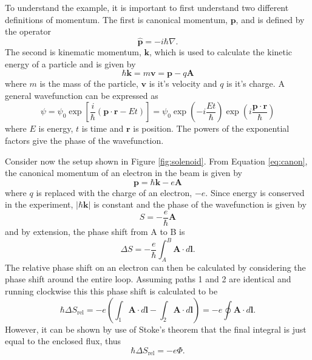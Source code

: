 \documentclass{article}
\begin{document}
To understand the example, it is important to first understand two different definitions of momentum. The first is canonical momentum, $\mathbf{p}$, and is defined by the operator
\begin{equation}
    \hat{\mathbf{p}}=-i\hbar\nabla.
    \label{eq:canon}
\end{equation}
The second is kinematic momentum, $\mathbf{k}$, which is used to calculate the kinetic energy of a particle and is given by
\begin{equation}
    \hbar\mathbf{k}=m\mathbf{v}=\mathbf{p}-q\mathbf{A}
    \label{kinetic}
\end{equation}
where $m$ is the mass of the particle, $\mathbf{v}$ is it's velocity and $q$ is it's charge. A general wavefunction can be expressed as
\begin{equation}
    \psi=\psi_0\exp[\frac{i}{\hbar}(\mathbf{p}\cdot\mathbf{r}-Et)]=\psi_0\exp(-i\frac{Et}{\hbar})\exp(i\frac{\mathbf{p}\cdot\mathbf{r}}{\hbar})
\end{equation}
where $E$ is energy, $t$ is time and $\mathbf{r}$ is position. The powers of the exponential factors give the phase of the wavefunction.

Consider now the setup shown in Figure \ref{fig:solenoid}. From Equation \eqref{eq:canon}, the canonical momentum of an electron in the beam is given by
\begin{equation}
    \mathbf{p}=\hbar\mathbf{k}-e\mathbf{A}
\end{equation}
where $q$ is replaced with the charge of an electron, $-e$. Since energy is conserved in the experiment, $|\hbar\mathbf{k}|$ is constant and the phase of the wavefunction is given by
\begin{equation}
    S=-\frac{e}{\hbar}\mathbf{A}
\end{equation}
and by extension, the phase shift from A to B is
\begin{equation}
    \Delta S=-\frac{e}{\hbar}\int_A^B\mathbf{A}\cdot d\mathbf{l}.
\end{equation}
The relative phase shift on an electron can then be calculated by considering the phase shift around the entire loop. Assuming paths 1 and 2 are identical and running clockwise this this phase shift is calculated to be
\begin{equation}
    \hbar\Delta S_\text{rel}=-e\left(\int_1\mathbf{A}\cdot d\mathbf{l}-\int_2\mathbf{A}\cdot d\mathbf{l}\right)=-e\oint\mathbf{A}\cdot d\mathbf{l}.
\end{equation}
However, it can be shown by use of Stoke's theorem that the final integral is just equal to the enclosed flux, thus
\begin{equation}
    \hbar\Delta S_\text{rel}=-e\Phi.
\end{equation}
\end{document}
